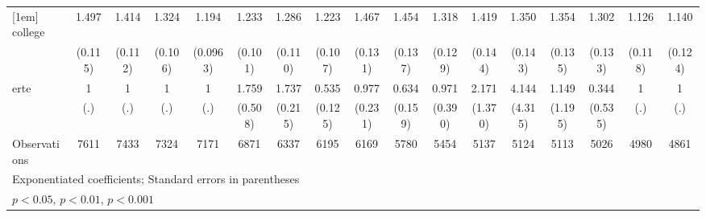 {\begin{tabular}{l*{16}{c}}
[1em]
college             &       1.497\sym{***}&       1.414\sym{***}&       1.324\sym{***}&       1.194\sym{*}  &       1.233\sym{*}  &       1.286\sym{**} &       1.223\sym{*}  &       1.467\sym{***}&       1.454\sym{***}&       1.318\sym{**} &       1.419\sym{***}&       1.350\sym{**} &       1.354\sym{**} &       1.302\sym{*}  &       1.126         &       1.140         \\
                    &     (0.115)         &     (0.112)         &     (0.106)         &    (0.0963)         &     (0.101)         &     (0.110)         &     (0.107)         &     (0.131)         &     (0.137)         &     (0.129)         &     (0.144)         &     (0.143)         &     (0.135)         &     (0.133)         &     (0.118)         &     (0.124)         \\
[1em]
erte                &           1         &           1         &           1         &           1         &       1.759         &       1.737\sym{***}&       0.535\sym{**} &       0.977         &       0.634         &       0.971         &       2.171         &       4.144         &       1.149         &       0.344         &           1         &           1         \\
                    &         (.)         &         (.)         &         (.)         &         (.)         &     (0.508)         &     (0.215)         &     (0.125)         &     (0.231)         &     (0.159)         &     (0.390)         &     (1.370)         &     (4.315)         &     (1.195)         &     (0.535)         &         (.)         &         (.)         \\
\hline
Observations        &        7611         &        7433         &        7324         &        7171         &        6871         &        6337         &        6195         &        6169         &        5780         &        5454         &        5137         &        5124         &        5113         &        5026         &        4980         &        4861         \\
\hline\hline
\multicolumn{17}{l}{\footnotesize Exponentiated coefficients; Standard errors in parentheses}\\
\multicolumn{17}{l}{\footnotesize \sym{*} \(p<0.05\), \sym{**} \(p<0.01\), \sym{***} \(p<0.001\)}\\
\end{tabular}
}
